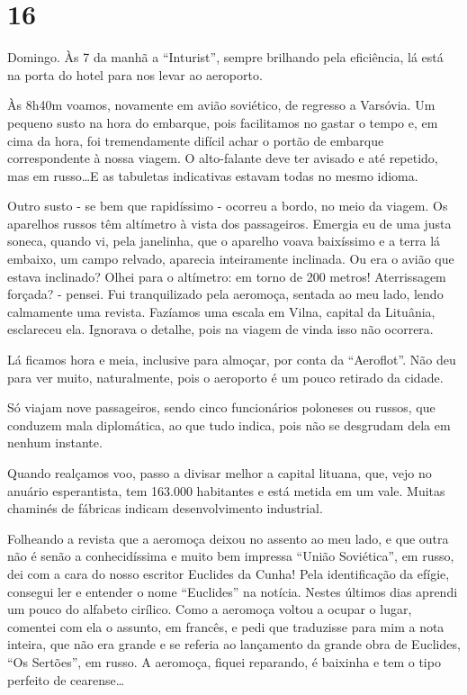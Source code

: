 \section*{16 \adfflatleafright {}}
Domingo. Às 7 da manhã a “Inturist”, sempre brilhando pela eficiência, lá está na porta do hotel para nos levar ao aeroporto.

Às 8h40m voamos, novamente em avião soviético, de regresso a Varsóvia. Um pequeno susto na hora do embarque, pois facilitamos no gastar o tempo e, em cima da hora, foi tremendamente difícil achar o portão de embarque correspondente à nossa viagem. O alto-falante deve ter avisado e até repetido, mas em russo\ldots E as tabuletas indicativas estavam todas no mesmo idioma.

Outro susto - se bem que rapidíssimo - ocorreu a bordo, no meio da viagem. Os aparelhos russos têm altímetro à vista dos passageiros. Emergia eu de uma justa soneca, quando vi, pela janelinha, que o aparelho voava baixíssimo e a terra lá embaixo, um campo relvado, aparecia inteiramente inclinada. Ou era o avião que estava inclinado? Olhei para o altímetro: em torno de 200 metros! Aterrissagem forçada? - pensei. Fui tranquilizado pela aeromoça, sentada ao meu lado, lendo calmamente uma revista. Fazíamos uma escala em Vilna, capital da Lituânia, esclareceu ela. Ignorava o detalhe, pois na viagem de vinda isso não ocorrera.

Lá ficamos hora e meia, inclusive para almoçar, por conta da “Aeroflot”. Não deu para ver muito, naturalmente, pois o aeroporto é um pouco retirado da cidade.

Só viajam nove passageiros, sendo cinco funcionários poloneses ou russos, que conduzem mala diplomática, ao que tudo indica, pois não se desgrudam dela em nenhum instante.

Quando realçamos voo, passo a divisar melhor a capital lituana, que, vejo no anuário esperantista, tem 163.000 habitantes e está metida em um vale. Muitas chaminés de fábricas indicam desenvolvimento industrial.

Folheando a revista que a aeromoça deixou no assento ao meu lado, e que outra não é senão a conhecidíssima e muito bem impressa “União Soviética”, em russo, dei com a cara do nosso escritor Euclides da Cunha! Pela identificação da efígie, consegui ler e entender o nome “Euclides” na notícia. Nestes últimos dias aprendi um pouco do alfabeto cirílico. Como a aeromoça voltou a ocupar o lugar, comentei com ela o assunto, em francês, e pedi que traduzisse para mim a nota inteira, que não era grande e se referia ao lançamento da grande obra de Euclides, “Os Sertões”, em russo. A aeromoça, fiquei reparando, é baixinha e tem o tipo perfeito de cearense\ldots

